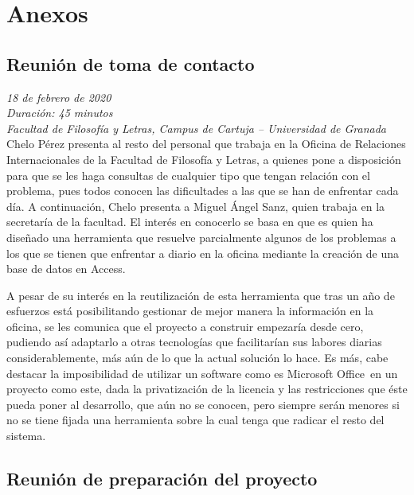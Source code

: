 \chapter*{Anexos}
\begin{appendices}
	\section*{Reunión de toma de contacto}
	\label{reunion1}
		\textit{18 de febrero de 2020}\\
		
		\textit{Duración: 45 minutos}\\

		\textit{Facultad de Filosofía y Letras, Campus de Cartuja -- Universidad de Granada}\\
		
		Chelo Pérez presenta al resto del personal que trabaja en la Oficina de Relaciones Internacionales de la Facultad de Filosofía y Letras, a quienes pone a disposición para que se les haga consultas de cualquier tipo que tengan relación con el problema, pues todos conocen las dificultades a las que se han de enfrentar cada día. A continuación, Chelo presenta a Miguel Ángel Sanz, quien trabaja en la secretaría de la facultad. El interés en conocerlo se basa en que es quien ha diseñado una herramienta que resuelve parcialmente algunos de los problemas a los que se tienen que enfrentar a diario en la oficina mediante la creación de una base de datos en Access\textregistered.
		
		A pesar de su interés en la reutilización de esta herramienta que tras un año de esfuerzos está posibilitando gestionar de mejor manera la información en la oficina, se les comunica que el proyecto a construir empezaría desde cero, pudiendo así adaptarlo a otras tecnologías que facilitarían sus labores diarias considerablemente, más aún de lo que la actual solución lo hace. Es más, cabe destacar la imposibilidad de utilizar un software como es Microsoft Office\textregistered \ en un proyecto como este, dada la privatización de la licencia y las restricciones que éste pueda poner al desarrollo, que aún no se conocen, pero siempre serán menores si no se tiene fijada una herramienta sobre la cual tenga que radicar el resto del sistema.
		
	\section*{Reunión de preparación del proyecto}
	\label{reunion2}
	

\end{appendices}
